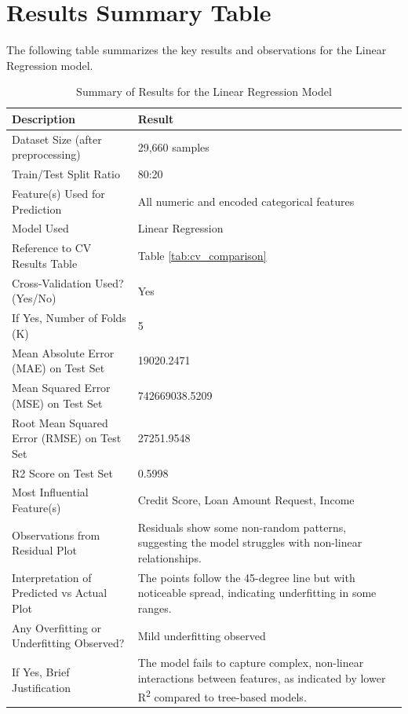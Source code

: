 \documentclass[12pt]{article}
\begin{document}
\section{Results Summary Table}
The following table summarizes the key results and observations for the Linear Regression model.
\begin{table}[H]
\centering
\caption{Summary of Results for the Linear Regression Model}
\begin{tabular}{|p{}|p{}|}
\hline
\textbf{Description} & \textbf{Result} \\
\hline
Dataset Size (after preprocessing) & 29,660 samples \\ 
\hline
Train/Test Split Ratio & 80:20 \\ 
\hline
Feature(s) Used for Prediction & All numeric and encoded categorical features \\ 
\hline
Model Used & Linear Regression \\ 
\hline
Reference to CV Results Table & Table \ref{tab:cv_comparison} \\ 
\hline
Cross-Validation Used? (Yes/No) & Yes \\ 
\hline
If Yes, Number of Folds (K) & 5 \\ 
\hline
Mean Absolute Error (MAE) on Test Set & 19020.2471 \\ 
\hline
Mean Squared Error (MSE) on Test Set & 742669038.5209 \\ 
\hline
Root Mean Squared Error (RMSE) on Test Set & 27251.9548 \\ 
\hline
R2 Score on Test Set & 0.5998 \\ 
\hline
Most Influential Feature(s) & Credit Score, Loan Amount Request, Income \\ 
\hline
Observations from Residual Plot & Residuals show some non-random patterns, suggesting the model struggles with non-linear relationships. \\ 
\hline
Interpretation of Predicted vs Actual Plot & The points follow the 45-degree line but with noticeable spread, indicating underfitting in some ranges. \\ 
\hline
Any Overfitting or Underfitting Observed? & Mild underfitting observed \\ 
\hline
If Yes, Brief Justification & The model fails to capture complex, non-linear interactions between features, as indicated by lower R\textsuperscript{2} compared to tree-based models. \\ 
\hline
\end{tabular}
\end{table}
\end{document}
